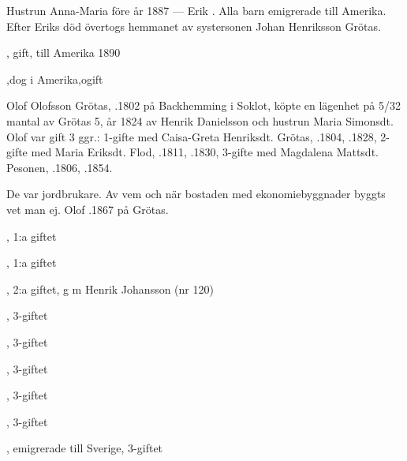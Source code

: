 Hustrun Anna-Maria \textdied före år 1887  ---  Erik . Alla barn emigrerade till Amerika. Efter Eriks död övertogs hemmanet av systersonen Johan Henriksson Grötas.
\begin{jhchildren}
  \item {}
  \item {}
  \item {}
  \item {}, gift, till Amerika 1890
  \item {}
  \item {}
  \item {},dog i Amerika,ogift
\end{jhchildren}


Olof Olofsson Grötas, .1802 på Backhemming i Soklot, köpte en lägenhet på 5/32 mantal av Grötas 5, år 1824 av Henrik Danielsson och hustrun Maria Simonsdt. Olof var gift 3 ggr.: 1-gifte med Caisa-Greta Henriksdt. Grötas, .1804, .1828, 2-gifte med Maria Eriksdt. Flod, .1811, .1830, 3-gifte med Magdalena Mattsdt. Pesonen, .1806, .1854.

De var jordbrukare. Av vem och när bostaden med ekonomiebyggnader byggts vet man ej. Olof .1867 på Grötas.
\begin{jhchildren}
  \item {}, 1:a giftet
  \item {}, 1:a giftet
  \item {}, 2:a giftet, g m Henrik Johansson (nr 120)
  \item {}, 3-giftet
  \item {}, 3-giftet
  \item {}, 3-giftet
  \item {}, 3-giftet
  \item {}, 3-giftet
  \item {}, emigrerade till Sverige, 3-giftet
\end{jhchildren}



